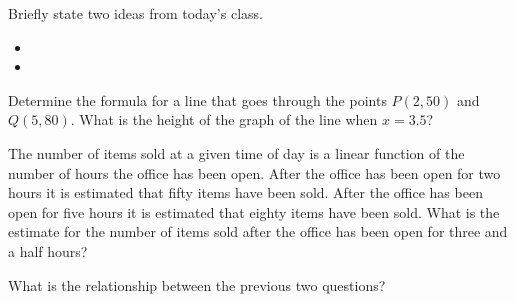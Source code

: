 \postClass

\begin{problem}
\item Briefly state two ideas from today's class.
  \begin{itemize}
  \item 
  \item 
  \end{itemize}
\item Determine the formula for a line that goes through the points
  $P(2,50)$ and $Q(5,80)$. What is the height of the graph of the line
  when $x=3.5$?
\item The number of items sold at a given time of day is a linear
  function of the number of hours the office has been open. After the
  office has been open for two hours it is estimated that fifty items
  have been sold. After the office has been open for five hours it is
  estimated that eighty items have been sold. What is the estimate for
  the number of items sold after the office has been open for three
  and a half hours?
\item What is the relationship between the previous two questions?
\end{problem}

